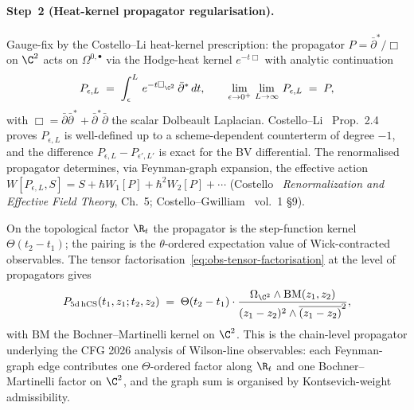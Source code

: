 \paragraph{Step~2 (Heat-kernel propagator regularisation).}
Gauge-fix by the Costello--Li heat-kernel prescription:
the propagator $P = \bar\partial^*/\Box$ on $\C^2$ acts on
$\Omega^{0,\bullet}$ via the Hodge-heat kernel $e^{-t\Box}$ with
analytic continuation
\begin{equation}
\label{eq:heat-propagator}
  P_{\epsilon,L} \;=\; \int_\epsilon^{L}\, e^{-t\Box_{\C^2}}\,\bar\partial^*\, dt,
\qquad
  \lim_{\epsilon\to 0^+}\,\lim_{L\to\infty}\, P_{\epsilon,L} \;=\; P,
\end{equation}
with $\Box = \bar\partial\bar\partial^* + \bar\partial^*\bar\partial$
the scalar Dolbeault Laplacian. Costello--Li~\cite{CostelloLi2016}
Prop.~2.4 proves $P_{\epsilon,L}$ is well-defined up to a scheme-dependent
counterterm of degree $-1$, and the difference
$P_{\epsilon,L} - P_{\epsilon',L'}$ is exact for the BV differential.
The renormalised propagator determines, via Feynman-graph expansion,
the effective action
$W[P_{\epsilon,L}, S] = S + \hbar W_1[P] + \hbar^2 W_2[P] + \cdots$
(Costello~\cite{Costello2011} \emph{Renormalization and Effective
Field Theory}, Ch.~5; Costello--Gwilliam~\cite{CostelloGwilliam}
vol.~1 §9).

On the topological factor $\R_t$ the propagator is the step-function
kernel $\Theta(t_2 - t_1)$; the pairing is the $\theta$-ordered
expectation value of Wick-contracted observables. The tensor
factorisation~\eqref{eq:obs-tensor-factorisation} at the level of
propagators gives
\begin{equation}
\label{eq:factored-propagator}
  P_{5\mathrm{d\,hCS}}(t_1,z_1;t_2,z_2) \;=\; \Theta(t_2-t_1)\cdot \frac{\Omega_{\C^2}\wedge \mathrm{BM}(z_1,z_2)}{(z_1-z_2)^2\wedge\overline{(z_1-z_2)}^2},
\end{equation}
with $\mathrm{BM}$ the Bochner--Martinelli kernel on $\C^2$. This is
the chain-level propagator underlying the CFG 2026 analysis of
Wilson-line observables: each Feynman-graph edge contributes one
$\Theta$-ordered factor along $\R_t$ and one Bochner--Martinelli factor
on $\C^2$, and the graph sum is organised by Kontsevich-weight
admissibility.

